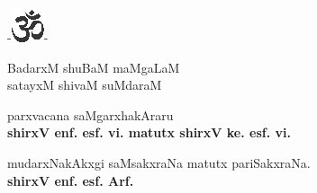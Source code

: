 \bigskip

\begin{center}
-\includegraphics{om.eps}-
\end{center}

\begin{center}
BadarxM shuBaM maMgaLaM\\
satayxM shivaM suMdaraM
\end{center}

\begin{flushright}
parxvacana saMgarxhakAraru\\[4pt]
{\bf shirxV enf. esf. vi. matutx shirxV ke. esf. vi.}
\end{flushright}

\begin{flushleft}
mudarxNakAkxgi saMsakxraNa matutx pariSakxraNa.\\
{\bf shirxV enf. esf. Arf.}
\end{flushleft}

